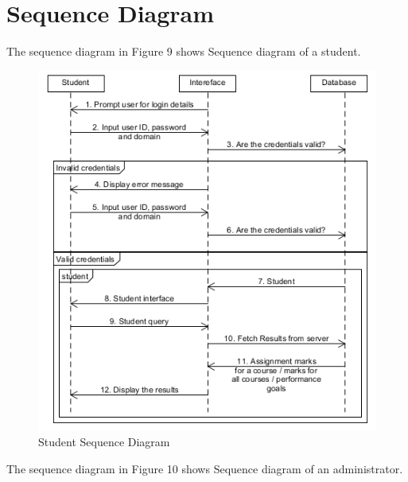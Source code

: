 	\newpage
	\section{Sequence Diagram}
	
	The sequence diagram in Figure 9 shows Sequence diagram of a student.  
	
	
	\begin{center}
		\begin{figure}[h]
			\centering
			\includegraphics[trim={0cm 0cm 0cm 0cm },clip,scale = 1.3]{StudentSequence}
			\caption{Student Sequence Diagram}
		\end{figure}
	\end{center}
	\newpage
	
	
	The sequence diagram in Figure 10 shows Sequence diagram of an administrator.  
	
